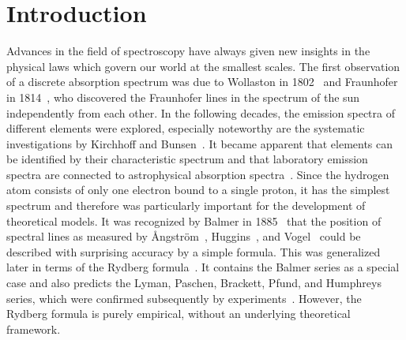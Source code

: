 \chapter*{Introduction}
Advances in the field of spectroscopy have always given new insights in the physical laws which govern our world at the smallest scales. %
The first observation of a discrete absorption spectrum was due to Wollaston in 1802~\cite{wollaston1802} and Fraunhofer in 1814~\cite{fraunhofer1817}, who discovered the Fraunhofer lines in the spectrum of the sun independently from each other.
In the following decades, the emission spectra of different elements were explored, especially noteworthy are the systematic investigations by Kirchhoff and Bunsen~\cite{kirchhoff1860,kirchhoff1861}. It became apparent that elements can be identified by their characteristic spectrum and that laboratory emission spectra are connected to astrophysical absorption spectra~\cite{angstrom1862}.
Since the hydrogen atom consists of only one electron bound to a single proton, it has the simplest spectrum and therefore was particularly important for the development of theoretical models. It was recognized by Balmer in 1885~\cite{balmer1885} that the position of spectral lines as measured by Ångström~\cite{angstrom1853}, Huggins~\cite{huggins1880}, and Vogel~\cite{vogel1880} could be described with surprising accuracy by a simple formula. This was generalized later in terms of the Rydberg formula~\cite{rydberg1889,martinson2005}. It contains the Balmer series as a special case and also predicts the Lyman, Paschen, Brackett, Pfund, and Humphreys series, which were confirmed subsequently by experiments~\cite{lyman1906,paschen1908,brackett1922,pfund1924,humphrey1953}. However, the Rydberg formula is purely empirical, without an underlying theoretical framework.

